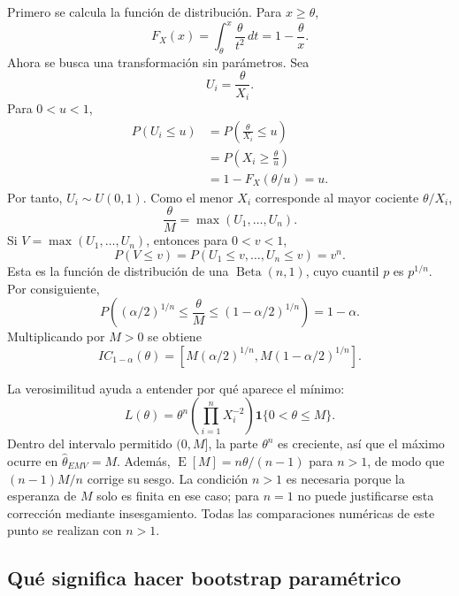 \documentclass[10pt,a4paper,oneside]{article}
\newcommand{\E}{\operatorname{E}}
\newcommand{\ind}{\mathbf{1}}
\begin{document}
Primero se calcula la función de distribución. Para $x\geq\theta$,
\begin{equation*}
F_X(x)=\int_{\theta}^{x}\frac{\theta}{t^2}\,dt
=1-\frac{\theta}{x}.
\end{equation*}
Ahora se busca una transformación sin parámetros. Sea
\begin{equation*}
U_i=\frac{\theta}{X_i}.
\end{equation*}
Para $0<u<1$,
\begin{align*}
P(U_i\leq u)
&=P\!\left(\frac{\theta}{X_i}\leq u\right)\\
&=P\!\left(X_i\geq\frac{\theta}{u}\right)\\
&=1-F_X(\theta/u)=u.
\end{align*}
Por tanto, $U_i\sim U(0,1)$. Como el menor $X_i$ corresponde al mayor cociente $\theta/X_i$,
\begin{equation*}
\frac{\theta}{M}=\max(U_1,\ldots,U_n).
\end{equation*}
Si $V=\max(U_1,\ldots,U_n)$, entonces para $0<v<1$,
\begin{equation*}
P(V\leq v)=P(U_1\leq v,\ldots,U_n\leq v)=v^n.
\end{equation*}
Esta es la función de distribución de una $\operatorname{Beta}(n,1)$, cuyo cuantil $p$ es $p^{1/n}$. Por consiguiente,
\begin{equation*}
P\!\left(
(\alpha/2)^{1/n}\leq\frac{\theta}{M}
\leq(1-\alpha/2)^{1/n}
\right)=1-\alpha.
\end{equation*}
Multiplicando por $M>0$ se obtiene
\begin{equation}
\boxed{
IC_{1-\alpha}(\theta)=
\left[
M(\alpha/2)^{1/n},
M(1-\alpha/2)^{1/n}
\right].}
\label{eq:ic-pareto}
\end{equation}

La verosimilitud ayuda a entender por qué aparece el mínimo:
\begin{equation*}
L(\theta)
=\theta^n\left(\prod_{i=1}^{n}X_i^{-2}\right)
\ind\{0<\theta\leq M\}.
\end{equation*}
Dentro del intervalo permitido $(0,M]$, la parte $\theta^n$ es creciente, así que el máximo ocurre en $\widehat\theta_{EMV}=M$. Además, $\E[M]=n\theta/(n-1)$ para $n>1$, de modo que $(n-1)M/n$ corrige su sesgo. La condición $n>1$ es necesaria porque la esperanza de $M$ solo es finita en ese caso; para $n=1$ no puede justificarse esta corrección mediante insesgamiento. Todas las comparaciones numéricas de este punto se realizan con $n>1$.

\subsection*{Qué significa hacer bootstrap paramétrico}
\end{document}
